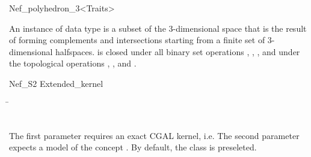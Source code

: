 
\ccRefPageBegin


\begin{ccRefClass}{Nef_polyhedron_3<Traits>}

\ccDefinition

An instance of data type  is a subset of the
3-dimensional space that is the result of forming complements and intersections
starting from a finite set  of
3-dimensional halfspaces.  is closed under all binary set
operations , , ,
 and under the topological operations ,
, and .

Nef_S2
Extended_kernel


\ccParameters

\begin{tabbing}
 \=\\
                 \>\\
\end{tabbing}

The first parameter requires an exact CGAL kernel, i.e. 
The second parameter expects a model of the concept .
By default, the class  is preseleted.

\ccTypes


\ccGlue
{}



\end{ccRefClass}
